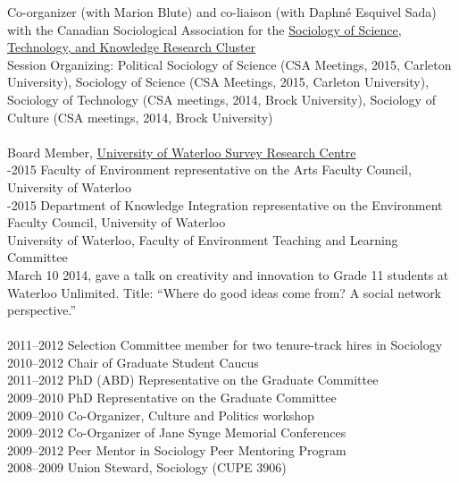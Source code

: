 \documentclass[9pt,usenames,dvipsnames]{article}
\begin{document}
\noindent Co-organizer (with Marion Blute) and co-liaison (with Daphné Esquivel Sada) with the Canadian Sociological Association for the \href{http://www.csa-scs.ca/files/webapps/csapress/sstk/}{Sociology of Science, Technology, and Knowledge Research Cluster}\\

\noindent Session Organizing: Political Sociology of Science (CSA Meetings, 2015, Carleton University), Sociology of Science (CSA Meetings, 2015, Carleton University), Sociology of Technology (CSA meetings, 2014, Brock University), Sociology of Culture (CSA meetings, 2014, Brock University) \\

 \\
 Board Member, \href{http://math.uwaterloo.ca/survey-research-centre/node/1}{University of Waterloo Survey Research Centre}  \\

-2015 Faculty of Environment representative on the Arts Faculty Council, University of Waterloo \\

-2015 Department of Knowledge Integration representative on the Environment Faculty Council, University of Waterloo \\

 University of Waterloo, Faculty of Environment Teaching and Learning Committee \\

\ind March 10 2014, gave a talk on creativity and innovation to Grade 11 students at Waterloo Unlimited. Title: ``Where do good ideas come from? A social network perspective.'' \\

\\
2011–2012 Selection Committee member for two tenure-track hires in Sociology\\
2010–2012 Chair of Graduate Student Caucus\\
2011–2012 PhD (ABD) Representative on the Graduate Committee\\
2009–2010 PhD Representative on the Graduate Committee\\
2009–2010 Co-Organizer, Culture and Politics workshop\\
2009–2012 Co-Organizer of Jane Synge Memorial Conferences\\
2009–2012 Peer Mentor in Sociology Peer Mentoring Program\\
2008–2009 Union Steward, Sociology (CUPE 3906)\\
\end{document}

